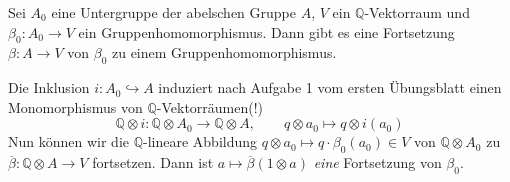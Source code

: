 \begin{lemma}[label=lem:abel_qvek,{name=[{Fortsetzungen für rationale Vektorräume}]}]
	Sei $A_0$ eine Untergruppe der abelschen Gruppe $A$, $V$ ein $\mathbb{Q}$-Vektorraum und $\beta_0 \colon A_0 \to V$ ein Gruppenhomomorphismus. Dann gibt es eine Fortsetzung 
	$\beta \colon A \to V$ von $\beta_0$ zu einem Gruppenhomomorphismus.  
\end{lemma}
\begin{beweis}
	Die Inklusion $i \colon A_0 \hookrightarrow A$ induziert nach Aufgabe 1 vom ersten Übungsblatt einen Monomorphismus von $\mathbb{Q}$-Vektorräumen(!)
	\[
		\mathbb{Q}\otimes i \colon \mathbb{Q} \otimes A_0 \longrightarrow \mathbb{Q} \otimes A , \qquad q \otimes a_0 \longmapsto q \otimes i(a_0)
	\]
	Nun können wir die $\mathbb{Q}$-lineare Abbildung $q \otimes a_0 \mapsto q \cdot \beta_0(a_0) \in V$ von $\mathbb{Q} \otimes A_0$ zu 
	$\overline{\beta} \colon \mathbb{Q} \otimes A \to V$ fortsetzen. 
	Dann ist $a \mapsto \overline{\beta}(1 \otimes a)$ \emph{eine} Fortsetzung von $\beta_0$.
\end{beweis}

